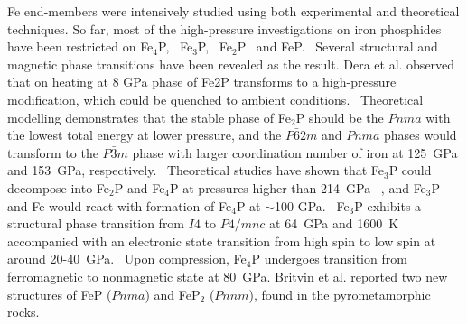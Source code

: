 \documentclass[twoside,twocolumn,9pt]{article}
\begin{document}


Fe end-members were intensively studied using both experimental and theoretical techniques. 
So far, most of the high-pressure investigations on iron phosphides have been restricted on Fe$_4$P,~\cite{Wu-2011-GRL} Fe$_3$P,~\cite{Scott-2007-GRL} Fe$_2$P~\cite{Dera-2008-GRL, Wu_2010-JPCM} and FeP.~\cite{Gu-2011-FeP-EPS}
Several structural and magnetic phase transitions have been revealed as the result. 
Dera et al. observed that on heating at 8 GPa phase of Fe2P transforms to a high-pressure modification, which could be quenched to ambient conditions.~\cite{Dera-2008-GRL} 
Theoretical modelling demonstrates that the stable phase of Fe$_2$P should be the $Pnma$ with the lowest total energy at lower pressure, and the $P\bar{6}2m$ and $Pnma$ phases would transform to the $P\bar{3}m$ phase with larger coordination number of iron at 125~GPa and 153~GPa, respectively.~\cite{Wu_2010-JPCM} 
Theoretical studies have shown that Fe$_3$P could decompose into Fe$_2$P and Fe$_4$P at pressures higher than 214~GPa ~\cite{Zhao-2017-RSC-Adv}, and Fe$_3$P and Fe would react with formation of Fe$_4$P at $\sim$100 GPa.~\cite{Wu-2011-GRL} 
Fe$_3$P exhibits a structural phase transition from $I4$ to $P4/mnc$ at 64~GPa and 1600~K accompanied with an electronic state transition from high spin to low spin at around 20-40~GPa.~\cite{GU2014-EPSL, Gu-2016-AmMiner-Fe3P}
Upon compression, Fe$_4$P undergoes transition from ferromagnetic to nonmagnetic state at 80~GPa.\cite{Wu-2011-GRL}
Britvin et al. reported two new structures of FeP ($Pnma$) and FeP$_2$ ($Pnnm$), found in the pyrometamorphic rocks.  \cite {Britvin2019-PCM-Fe2P,Britvin2019-murashkoite-MP-FeP}
\end{document}

